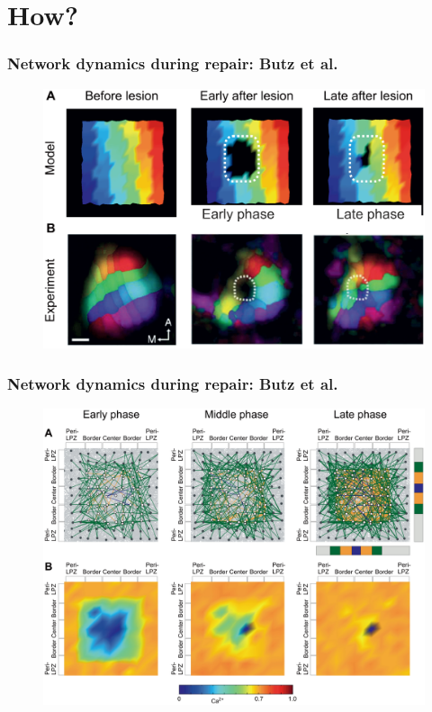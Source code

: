 \section{How?}
\begin{frame}[c]
  \frametitle{Network dynamics during repair: Butz et al.}
  \begin{figure}[h]
    \centering
    \includegraphics[width=0.8\linewidth]{99_images/butz-figure8.png}
  \end{figure}
\end{frame}
\begin{frame}[c]
  \frametitle{Network dynamics during repair: Butz et al.}
  \begin{figure}[h]
    \centering
    \includegraphics[width=0.8\linewidth]{99_images/butz3.png}
  \end{figure}
\end{frame}
